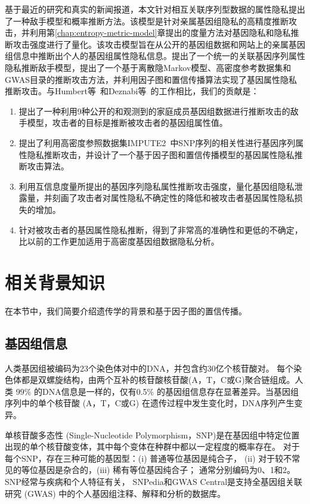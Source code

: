基于最近的研究和真实的新闻报道，本文针对相互关联序列型数据的属性隐私提出了一种敌手模型和概率推断方法。该模型是针对亲属基因组隐私的高精度推断攻击，并利用第\ref{chap:entropy-metric-model}章提出的度量方法对基因隐私和隐私推断攻击强度进行了量化。该攻击模型旨在从公开的基因组数据和网站上的亲属基因组信息中推断出个人的基因组属性隐私信息。提出了一个统一的关联基因序列属性隐私推断敌手模型，提出了一个基于离散隐Markov模型、高密度参考数据集和GWAS目录的推断攻击方法，并利用因子图和置信传播算法实现了基因属性隐私推断攻击。与Humbert等~\cite{humbert2013addressing,humbert2017quantifying}和Deznabi等~\cite{deznabi2018inference}的工作相比，我们的贡献是：

\begin{enumerate}
	\item 提出了一种利用9种公开的和观测到的家庭成员基因组数据进行推断攻击的敌手模型，攻击者的目标是推断被攻击者的基因组属性值。
	\item 提出了利用高密度参照数据集IMPUTE2~\cite{howie2014impute2}中SNP序列的相关性进行基因序列属性隐私推断攻击，并设计了一个基于因子图和置信传播模型的基因属性隐私推断攻击算法。
	\item 利用互信息度量所提出的基因序列隐私属性推断攻击强度，量化基因组隐私泄露量，并刻画了攻击者对属性隐私不确定性的降低和被攻击者基因属性隐私损失的增加。
	\item 针对被攻击者的基因属性隐私推断，得到了非常高的准确性和更低的不确定，比以前的工作更加适用于高密度基因组数据隐私分析。
\end{enumerate}

\section{相关背景知识}
\label{sec:backgrounds}
在本节中，我们简要介绍遗传学的背景和基于因子图的置信传播。

\subsection{基因组信息}

人类基因组被编码为23个染色体对中的DNA，并包含约30亿个核苷酸对。 每个染色体都是双螺旋结构，由两个互补的核苷酸核苷酸(A，T，C或G)聚合链组成。人类 99\% 的DNA信息是一样的，仅有0.5\% 的基因组信息存在显著差异。当基因组序列中的单个核苷酸 (A，T，C或G) 在遗传过程中发生变化时，DNA序列产生变异。

单核苷酸多态性 (Single-Nucleotide Polymorphism，SNP)是在基因组中特定位置出现的单个核苷酸变体，其中每个变体在种群中都以一定程度的概率存在。 对于每个SNP，存在三种可能的基因型：(i) 普通等位基因是纯合子， (ii) 对于较不常见的等位基因是杂合的，(iii) 稀有等位基因纯合子； 通常分别编码为0、1和2。 SNP经常与疾病和个人特征有关， SNPedia和GWAS Central是支持全基因组关联研究 (GWAS) 中的个人基因组注释、解释和分析的数据库。

